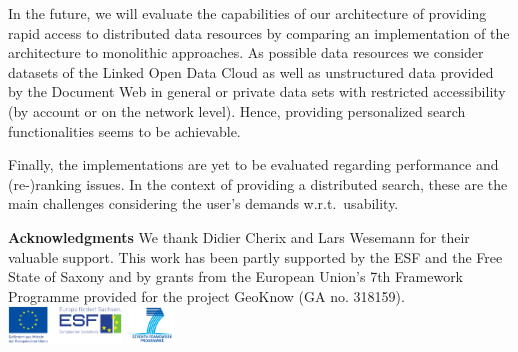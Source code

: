 \documentclass{acm_proc_article-sp}
\begin{document}
In the future, we will evaluate the capabilities of our architecture of providing rapid access to distributed data resources by comparing an implementation of the architecture to monolithic approaches. 
As possible data resources we consider datasets of the Linked Open Data Cloud as well as unstructured data provided by the Document Web in general or private data sets with restricted accessibility (by account or on the network level).
Hence, providing per\-so\-na\-lized search functionalities seems to be achievable.

Finally, the implementations are yet to be evaluated regarding performance and (re-)ranking issues. 
In the context of providing a distributed search, these are the main challenges considering the user's demands w.r.t.\ usability.







\textbf{Acknowledgments} We thank Didier Cherix and Lars Wesemann for their valuable support. This work has been partly supported by the ESF and the Free State of Saxony and by grants from the European Union's 7th Framework Programme provided for the project GeoKnow (GA no. 318159).\\
 {\includegraphics[height=1cm]{esfpng}}\,
 {\includegraphics[height=1cm]{2000px-seventh_framework_programme_logo}}



 
\end{document}
